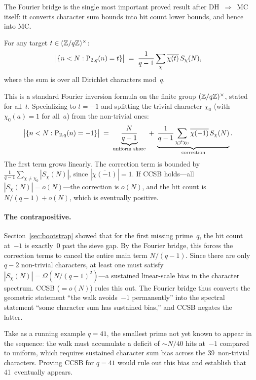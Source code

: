 The Fourier bridge is the single most important proved result after
DH~$\Rightarrow$~MC itself: it converts character sum bounds into hit
count lower bounds, and hence into MC.

\begin{theorem}
\label{thm:fourier-step}
For any target $t \in (\mathbb{Z}/q\mathbb{Z})^\times$:
\[
  \bigl|\{n < N : \mathrm{P}_{2,q}(n) = t\}\bigr|
  \;=\; \frac{1}{q-1}\sum_{\chi} \overline{\chi(t)}\, S_\chi(N),
\]
where the sum is over all Dirichlet characters mod~$q$.
\end{theorem}

This is a standard Fourier inversion formula on the finite group
$(\mathbb{Z}/q\mathbb{Z})^\times$, stated for all~$t$.  Specializing to $t = -1$
and splitting the trivial character $\chi_0$ (with $\chi_0(a) = 1$
for all~$a$) from the non-trivial ones:
\[
  \bigl|\{n < N : \mathrm{P}_{2,q}(n) = -1\}\bigr|
  \;=\; \underbrace{\frac{N}{q-1}}_{\text{uniform share}}
  \;+\; \underbrace{\frac{1}{q-1}\sum_{\chi \neq \chi_0}
    \overline{\chi(-1)}\, S_\chi(N)}_{\text{correction}}.
\]
The first term grows linearly.  The correction term is bounded by
$\tfrac{1}{q-1}\sum_{\chi \neq \chi_0} |S_\chi(N)|$, since
$|\overline{\chi(-1)}| = 1$.  If CCSB holds---all
$|S_\chi(N)| = o(N)$---the correction is $o(N)$, and the hit count
is $N/(q{-}1) + o(N)$, which is eventually positive.

\paragraph{The contrapositive.}
Section~\ref{sec:bootstrap} showed that for the first missing
prime~$q$, the hit count at~$-1$ is exactly~0 past the sieve gap.
By the Fourier bridge, this forces the correction terms to
cancel the entire main term $N/(q{-}1)$.  Since there are only
$q{-}2$ non-trivial characters, at least one must satisfy
$|S_\chi(N)| = \Omega(N/(q{-}1)^2)$---a sustained linear-scale
bias in the character spectrum.  CCSB ($= o(N)$) rules this out.
The Fourier bridge thus converts the geometric statement ``the walk
avoids~$-1$ permanently'' into the spectral statement ``some character
sum has sustained bias,'' and CCSB negates the latter.

Take as a running example $q = 41$, the smallest prime not yet known
to appear in the sequence: the walk must accumulate
a deficit of $\sim N/40$ hits at~$-1$ compared to uniform, which
requires sustained character sum bias across the 39~non-trivial
characters.  Proving CCSB for $q = 41$ would rule out this bias and
establish that 41~eventually appears.

